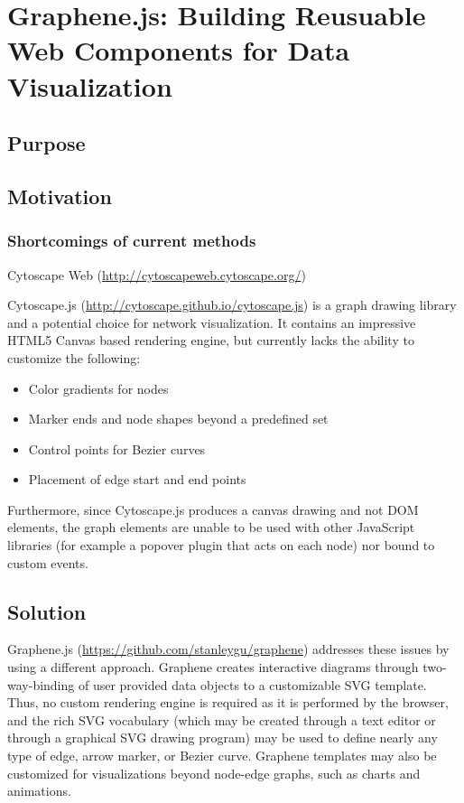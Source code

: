 \chapter{Graphene.js: Building Reusuable Web Components for Data Visualization}

\section{Purpose}

\section{Motivation}

\subsection{Shortcomings of current methods}

Cytoscape Web (\url{http://cytoscapeweb.cytoscape.org/})

Cytoscape.js (\url{http://cytoscape.github.io/cytoscape.js}) is a graph drawing library and a potential choice for network visualization. It contains an impressive HTML5 Canvas based rendering engine, but currently lacks the ability to customize the following:

\begin{itemize}
\item Color gradients for nodes
\item Marker ends and node shapes beyond a predefined set
\item Control points for Bezier curves
\item Placement of edge start and end points
\end{itemize}

Furthermore, since Cytoscape.js produces a canvas drawing and not DOM elements, the graph elements are unable to be used with other JavaScript libraries (for example a popover plugin that acts on each node) nor bound to custom events.

\section{Solution}

Graphene.js (\url{https://github.com/stanleygu/graphene}) addresses these issues by using a different approach. 
Graphene creates interactive diagrams through two-way-binding of user provided data objects to a customizable SVG template.
Thus, no custom rendering engine is required as it is performed by the browser, and the rich SVG vocabulary (which may be created through a text editor or through a graphical SVG drawing program) may be used to define nearly any type of edge, arrow marker, or Bezier curve.
Graphene templates may also be customized for visualizations beyond node-edge graphs, such as charts and animations.

